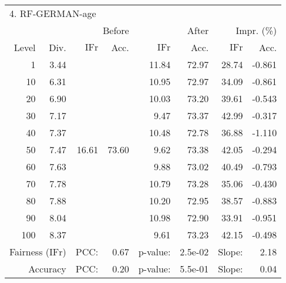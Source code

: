 \begin{tabular}{rr||rr|rr|rr}
\multicolumn{4}{l}{4. RF-GERMAN-age} & \multicolumn{2}{c}{} & \multicolumn{2}{c}{}\\
 &  & \multicolumn{2}{r|}{Before} & \multicolumn{2}{r|}{After} & \multicolumn{2}{r}{Impr. (\%)}\\
Level & Div. & $\mathrm{IFr}$ & Acc. & $\mathrm{IFr}$ & Acc. & $\mathrm{IFr}$ & Acc.\\
\hline
1 & 3.44 & \multirow{11}{*}{16.61} & \multirow{11}{*}{73.60} & 11.84 & 72.97 & 28.74 & -0.861\\
10 & 6.31 &  &  & 10.95 & 72.97 & 34.09 & -0.861\\
20 & 6.90 &  &  & 10.03 & 73.20 & 39.61 & -0.543\\
30 & 7.17 &  &  & 9.47 & 73.37 & 42.99 & -0.317\\
40 & 7.37 &  &  & 10.48 & 72.78 & 36.88 & -1.110\\
50 & 7.47 &  &  & 9.62 & 73.38 & 42.05 & -0.294\\
60 & 7.63 &  &  & 9.88 & 73.02 & 40.49 & -0.793\\
70 & 7.78 &  &  & 10.79 & 73.28 & 35.06 & -0.430\\
80 & 7.88 &  &  & 10.20 & 72.95 & 38.57 & -0.883\\
90 & 8.04 &  &  & 10.98 & 72.90 & 33.91 & -0.951\\
100 & 8.37 &  &  & 9.61 & 73.23 & 42.15 & -0.498\\
\hline
\multicolumn{2}{r}{Fairness ($\mathrm{IFr}$)} & PCC: & \multicolumn{1}{r}{0.67} & p-value:  & \multicolumn{1}{r}{2.5e-02} & Slope:  & 2.18\\
\multicolumn{2}{r}{Accuracy} & PCC: & \multicolumn{1}{r}{0.20} & p-value:  & \multicolumn{1}{r}{5.5e-01} & Slope:  & 0.04\\
\end{tabular}